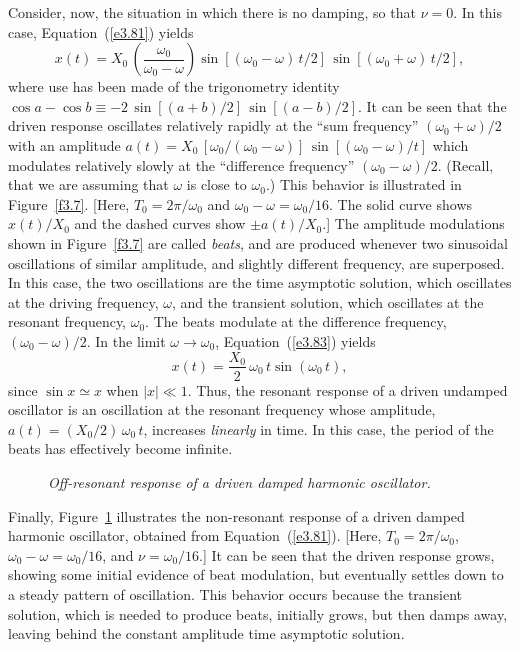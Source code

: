 Consider, now, the situation in which there is no damping, so that $\nu=0$. In this
case, Equation~(\ref{e3.81}) yields
\begin{equation}\label{e3.83}
x(t) = X_0\,\left(\frac{\omega_0}{\omega_0-\omega}\right)\sin[(\omega_0-\omega)\,t/2]\,\sin[(\omega_0+\omega)\,t/2],
\end{equation}
where use has been made of the trigonometry identity $\cos a - \cos b \equiv -2\,\sin[(a+b)/2]\,\sin[(a-b)/2]$. It can be seen that the driven response oscillates relatively rapidly at the ``sum frequency''
$(\omega_0+\omega)/2$ with an amplitude $a(t) = X_0\,[\omega_0/(\omega_0-\omega)]\,\sin[(\omega_0-\omega)/t]$ which modulates relatively slowly at the
``difference frequency'' $(\omega_0-\omega)/2$. (Recall, that we are assuming that
$\omega$ is close to $\omega_0$.) This behavior is illustrated in
Figure~\ref{f3.7}. [Here, $T_0=2\pi/\omega_0$ and $\omega_0-\omega=\omega_0/16$. The solid curve
shows $x(t)/X_0$ and the dashed curves show $\pm a(t)/X_0$.] The amplitude modulations shown
in Figure~\ref{f3.7} are called {\em beats}, and are produced whenever two
sinusoidal oscillations of similar amplitude, and slightly different frequency,
are superposed. In this case, the two oscillations are the time asymptotic solution,
which oscillates at the driving frequency, $\omega$, and the transient
solution, which oscillates at the resonant frequency, $\omega_0$. The beats
modulate at the difference frequency, $(\omega_0-\omega)/2$. In the limit $\omega\rightarrow\omega_0$, Equation~(\ref{e3.83}) yields
\begin{equation}
x(t) = \frac{X_0}{2}\,\omega_0\,t\sin(\omega_0\,t),
\end{equation}
since $\sin x\simeq x$ when $|x|\ll 1$. Thus, the resonant response of a
driven undamped oscillator is an oscillation at the resonant frequency whose
amplitude, $a(t) = (X_0/2)\,\omega_0\,t$, increases {\em linearly}\/ in time. In this case, the period of the beats has
effectively become infinite. 

\begin{figure}
\epsfysize=3in
\centerline{}
\caption{\em Off-resonant response of a driven damped harmonic oscillator.}\label{f3.8}   
\end{figure}

Finally, Figure~\ref{f3.8} illustrates the non-resonant response of a driven
dam\-ped harmonic oscillator, obtained from Equation~(\ref{e3.81}). [Here, $T_0=2\pi/\omega_0$, $\omega_0-\omega=\omega_0/16$, and $\nu = \omega_0/16$.]
It can be seen that the driven response grows, showing some initial evidence of
beat modulation, but eventually settles down to a steady pattern of oscillation. 
This behavior occurs because the transient solution, which is needed to produce beats,
initially grows, but then  damps away, leaving behind the constant amplitude
time asymptotic solution. 

